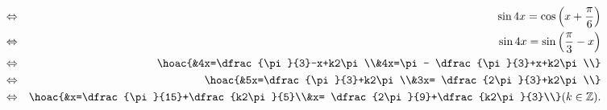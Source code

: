 \begin{bt}
{\begin{enumerate}
\begin{eqnarray*}
				&\Leftrightarrow& \sin 4x = \cos\left(x + \dfrac{\pi}{6}\right)\\
				&\Leftrightarrow& \sin 4x = \sin \left(\dfrac{\pi}{3}-x\right)\\
				&\Leftrightarrow& \hoac{&4x=\dfrac{\pi}{3}-x+k2\pi\\&4x=\pi - \dfrac{\pi}{3}+x+k2\pi\\}\\
				&\Leftrightarrow& \hoac{&5x=\dfrac{\pi}{3}+k2\pi\\&3x= \dfrac{2\pi}{3}+k2\pi\\}\\
				&\Leftrightarrow& \hoac{&x=\dfrac{\pi}{15}+\dfrac{k2\pi}{5}\\&x= \dfrac{2\pi}{9}+\dfrac{k2\pi}{3}\\} (k\in \mathbb{Z}).
			\end{eqnarray*}
		\end{enumerate}
		
	}
\end{bt}

